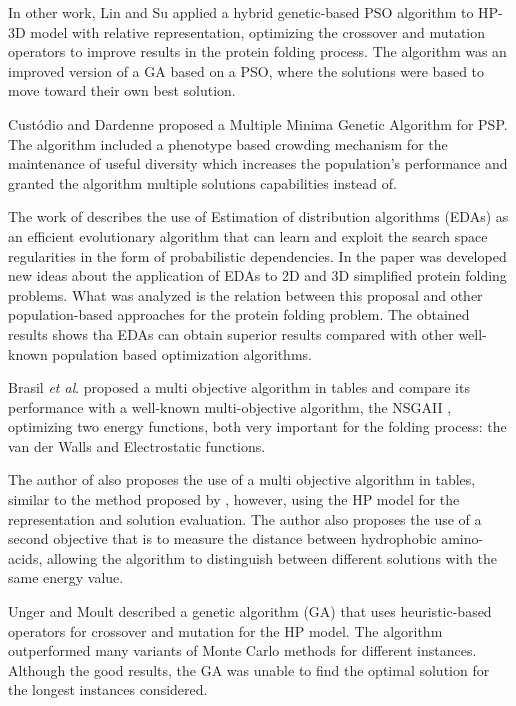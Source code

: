 In other work, Lin and Su \cite{lin2011protein} applied a hybrid genetic-based PSO algorithm to HP-3D model with relative representation, optimizing the crossover and mutation operators to improve results in the protein folding process. The algorithm was an improved version of a GA based on a PSO, where the solutions were based to move toward their own best solution.


Cust\'{o}dio and Dardenne \cite{custodio2014multiple} proposed a Multiple Minima Genetic Algorithm for PSP. The algorithm included a phenotype based crowding mechanism for the maintenance of useful diversity which increases the population's performance and granted the algorithm multiple solutions capabilities instead of.


The work of \cite{santana2008protein} describes the use of Estimation of distribution algorithms (EDAs) as an efficient evolutionary algorithm that can learn and exploit the search space regularities in the form of probabilistic dependencies. In the paper was developed new ideas about the application of EDAs to 2D and 3D simplified protein folding problems. What was analyzed is the relation between this proposal and other population-based approaches for the protein folding problem. The obtained results shows tha EDAs can obtain superior results compared with other well-known population based optimization algorithms.


Brasil \textit{et al}.\cite{soares2011investigating} proposed a multi objective algorithm in tables and compare its performance with a well-known multi-objective algorithm, the NSGAII \cite{deb2002fast}, optimizing two energy functions, both very important for the folding process: the van der Walls and Electrostatic functions.


The author of \cite{gabriel2012algoritmos} also proposes the use of a multi objective algorithm in tables, similar to the method proposed by \cite{soares2011investigating}, however, using the HP model for the representation and solution evaluation. The author also proposes the use of a second objective that is to measure the distance between hydrophobic amino-acids, allowing the algorithm to distinguish between different solutions with the same energy value.


Unger and Moult \cite{unger1993genetic} described a genetic algorithm (GA) that uses heuristic-based operators for crossover and mutation for the HP model. The algorithm outperformed many variants of Monte Carlo methods for different instances. Although the good results, the GA was unable to find the optimal solution for the longest instances considered.



